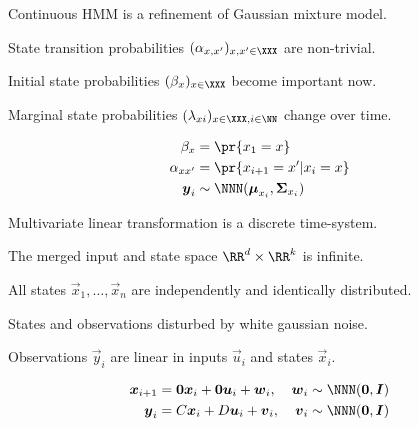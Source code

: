 \documentclass[landscape,footrule]{foils}
\begin{document}


Continuous HMM is a refinement of Gaussian mixture model.
\begin{triangles}
\item State transition probabilities $(\alpha_{x,x'})_{x,x'\in\XXX}$ are non-trivial.
\item Initial state probabilities $(\beta_{x})_{x\in\XXX}$ become important now.
\item Marginal state probabilities $(\lambda_{xi})_{x\in\XXX,i\in\NN}$ change over time.
\end{triangles}
\begin{align*}
\beta_x&=\pr{x_1=x}\\
\alpha_{xx'}&=\pr{x_{i+1}=x'|x_{i}=x}\\
\vec{y}_i&\sim\NNN(\vec{\mu}_{x_i},\vec{\Sigma}_{x_i})
\end{align*}





Multivariate linear transformation is a discrete time-system.
\begin{triangles}
\item The merged input and state space $\RR^{d}\times\RR^k$ is infinite. 
\item All states $\vec{x}_1,\ldots,\vec{x}_n$ are independently and identically distributed.  
\item States and observations disturbed by white gaussian noise.
\item Observations $\vec{y}_i$ are linear in inputs $\vec{u}_i$ and states $\vec{x}_i$.
\end{triangles}
\begin{align*}
\vec{x}_{i+1}&=\vec{0}\vec{x}_{i}+\vec{0}\vec{u}_{i}+\vec{w}_{i}, &\vec{w}_{i}&\sim \NNN(\vec{0}, \vec{I})\\
\vec{y}_i&=C\vec{x}_i+D\vec{u}_i+\vec{v}_i, &\vec{v}_{i}&\sim \NNN(\vec{0}, \vec{I})
\end{align*}




\end{document}
